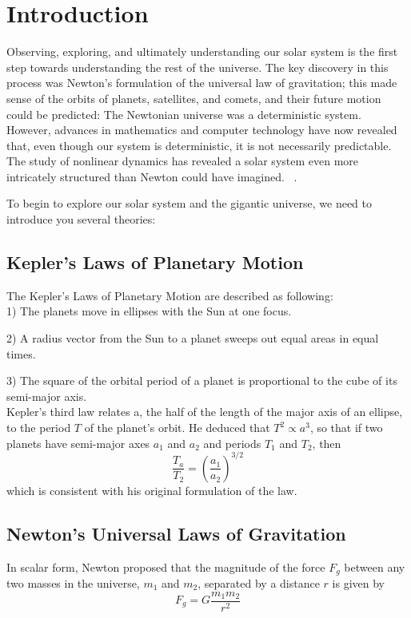 \section{Introduction}

Observing, exploring, and ultimately understanding our solar system is the first step towards understanding the rest of the universe. The key discovery in this process was Newton’s formulation of the universal law of gravitation; this made sense of the orbits of planets, satellites, and comets, and their future motion could be predicted: The Newtonian universe was a deterministic system. However, advances in mathematics and computer technology have now revealed that, even though our system is deterministic, it is not necessarily predictable. The study of nonlinear dynamics has revealed a solar system even more intricately structured than Newton could have imagined. ~\cite{99MurraySolarSys}.

To begin to explore our solar system and the gigantic universe, we need to introduce you several theories:

\subsection{Kepler's Laws of Planetary Motion}
\label{Kepler's Laws}
The Kepler's Laws of Planetary Motion are described as following: \\

1) The planets move in ellipses with the Sun at one focus.

2) A radius vector from the Sun to a planet sweeps out equal areas in
equal times.\label{Kepler Second Law}

3) The square of the orbital period of a planet is proportional to the cube of its semi-major axis. \\

Kepler’s third law relates a, the half of the length of the major axis of an ellipse, to the period $T$ of the planet’s orbit. He deduced that $T^2 \propto a^3$, so that if two planets have semi-major axes $a_1$ and $a_2$ and periods $T_1$ and $T_2$, then 
\begin{equation}
    \frac{T_a}{T_2} = (\frac{a_1}{a_2})^{3/2}
\end{equation}
which is consistent with his original formulation of the law. 

\subsection{Newton's Universal Laws of Gravitation}
In scalar form, Newton proposed that the magnitude of the force $F_g$ between any two masses in the universe, $m_1$ and $m_2$, separated by a distance $r$ is given by
\begin{equation}
F_{g} = G\frac{m_{1}m_{2}}{r^2}
\label{eq:unigrav}
\end{equation}

